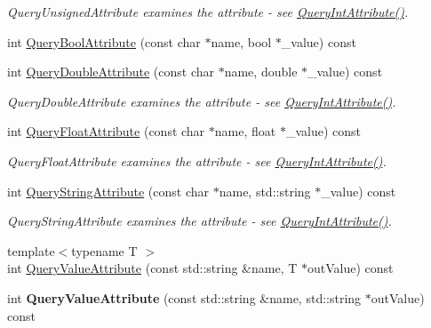 \begin{DoxyCompactItemize}
\begin{DoxyCompactList}\small\item\em Query\+Unsigned\+Attribute examines the attribute -\/ see \hyperlink{class_ti_xml_element_aea0bfe471380f281c5945770ddbf52b9}{Query\+Int\+Attribute()}. \end{DoxyCompactList}\item 
int \hyperlink{class_ti_xml_element_af4a1d3f88c28eb0f3115dc39ebd83fff}{Query\+Bool\+Attribute} (const char $\ast$name, bool $\ast$\+\_\+value) const 
\item 
\hypertarget{class_ti_xml_element_a898d7730ecc341f0bffc7a9dadbf1ce7}{int \hyperlink{class_ti_xml_element_a898d7730ecc341f0bffc7a9dadbf1ce7}{Query\+Double\+Attribute} (const char $\ast$name, double $\ast$\+\_\+value) const }\label{class_ti_xml_element_a898d7730ecc341f0bffc7a9dadbf1ce7}

\begin{DoxyCompactList}\small\item\em Query\+Double\+Attribute examines the attribute -\/ see \hyperlink{class_ti_xml_element_aea0bfe471380f281c5945770ddbf52b9}{Query\+Int\+Attribute()}. \end{DoxyCompactList}\item 
\hypertarget{class_ti_xml_element_aa04d3af11601ef5a5f88295203a843be}{int \hyperlink{class_ti_xml_element_aa04d3af11601ef5a5f88295203a843be}{Query\+Float\+Attribute} (const char $\ast$name, float $\ast$\+\_\+value) const }\label{class_ti_xml_element_aa04d3af11601ef5a5f88295203a843be}

\begin{DoxyCompactList}\small\item\em Query\+Float\+Attribute examines the attribute -\/ see \hyperlink{class_ti_xml_element_aea0bfe471380f281c5945770ddbf52b9}{Query\+Int\+Attribute()}. \end{DoxyCompactList}\item 
\hypertarget{class_ti_xml_element_a14321ac360efe906ed449d9db3fd9961}{int \hyperlink{class_ti_xml_element_a14321ac360efe906ed449d9db3fd9961}{Query\+String\+Attribute} (const char $\ast$name, std\+::string $\ast$\+\_\+value) const }\label{class_ti_xml_element_a14321ac360efe906ed449d9db3fd9961}

\begin{DoxyCompactList}\small\item\em Query\+String\+Attribute examines the attribute -\/ see \hyperlink{class_ti_xml_element_aea0bfe471380f281c5945770ddbf52b9}{Query\+Int\+Attribute()}. \end{DoxyCompactList}\item 
{\footnotesize template$<$typename T $>$ }\\int \hyperlink{class_ti_xml_element_a676f888438f8eb8d69a695ead195edb8}{Query\+Value\+Attribute} (const std\+::string \&name, T $\ast$out\+Value) const 
\item 
\hypertarget{class_ti_xml_element_a93fb47dab50d5f0d2912b789648c48ca}{int {\bfseries Query\+Value\+Attribute} (const std\+::string \&name, std\+::string $\ast$out\+Value) const }\label{class_ti_xml_element_a93fb47dab50d5f0d2912b789648c48ca}


\end{DoxyCompactItemize}
